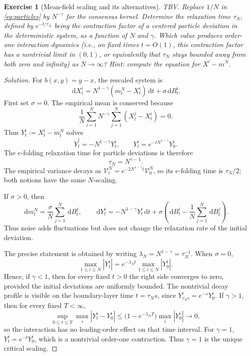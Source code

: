 \documentclass[11pt]{amsart}
\numberwithin{equation}{section}
\theoremstyle{plain}
\newtheorem{exercise}[theorem]{Exercise}
\newcommand{\dd}{\,\mathrm{d}}
\newcommand{\abs}[1]{\left\lvert#1\right\rvert}
\begin{document}
\begin{exercise}[Mean-field scaling and its alternatives] TBV. 
Replace $1/N$ in \eqref{eq:particles} by $N^{-\gamma}$ for the consensus
kernel.  Determine the relaxation time $\tau_N$, defined by
$e^{-t/\tau_N}$ being the contraction factor of a centered particle
deviation in the deterministic system, as a function of $N$ and $\gamma$.
Which value produces order-one interaction dynamics (i.e., on
fixed times $t=O(1)$, this contraction factor has a nontrivial limit in
$(0,1)$, or equivalently that $\tau_N$ stays bounded away from both zero and
infinity) as $N\to\infty$?
\emph{Hint:} compute the equation for $X^i-m^N$.
\end{exercise}
\begin{proof}[Solution]
For $b(x,y)=y-x$, the rescaled system is
\begin{equation}\label{eq:scaled-consensus}
 \dd X_t^i=N^{1-\gamma}(m_t^N-X_t^i)\dd t+\sigma\dd B_t^i.
\end{equation}
First set $\sigma=0$.  The empirical mean is conserved because
\[
 \frac1N\sum_{i=1}^N N^{-\gamma}
       \sum_{j=1}^N(X_t^j-X_t^i)=0.
\]
Thus $Y_t^i:=X_t^i-m_t^N$ solves
\[
 \dot Y_t^i=-N^{1-\gamma}Y_t^i,
 \qquad
 Y_t^i=e^{-t N^{1-\gamma}}Y_0^i.
\]
The $e$-folding relaxation time for particle deviations is therefore
\begin{equation}\label{eq:relaxation-time}
 \tau_N=N^{\gamma-1}.
\end{equation}
The empirical variance decays as
$\mathcal V_t^N=e^{-2N^{1-\gamma}t}\mathcal V_0^N$, so its $e$-folding time is
$\tau_N/2$; both notions have the same $N$-scaling.

If $\sigma>0$, then
\[
 \dd m_t^N=\frac{\sigma}{N}\sum_{j=1}^N\dd B_t^j,
 \qquad
 \dd Y_t^i=-N^{1-\gamma}Y_t^i\dd t
 +\sigma\left(\dd B_t^i-\frac1N\sum_{j=1}^N\dd B_t^j\right).
\]
Thus noise adds fluctuations but does not change the relaxation rate of the
initial deviation. 

The precise statement is obtained by writing
$\lambda_N=N^{1-\gamma}=\tau_N^{-1}$.  When $\sigma=0$,
\[
 \max_{1\leq i\leq N}\abs{Y_t^i}
 =e^{-\lambda_Nt}\max_{1\leq i\leq N}\abs{Y_0^i}.
\]
Hence, if $\gamma<1$, then for every fixed $t>0$ the right side converges to
zero, provided the initial deviations are uniformly bounded.  The nontrivial
decay profile is visible on the boundary-layer time $t=\tau_Ns$, since
$Y_{\tau_Ns}^i=e^{-s}Y_0^i$.  If $\gamma>1$, then for every fixed $T<\infty$,
\[
 \sup_{0\leq t\leq T}\max_i\abs{Y_t^i-Y_0^i}
 \leq\bigl(1-e^{-\lambda_NT}\bigr)\max_i\abs{Y_0^i}
 \longrightarrow0,
\]
so the interaction has no leading-order effect on that time interval.  For
$\gamma=1$, $Y_t^i=e^{-t}Y_0^i$, which is a nontrivial order-one contraction.
Thus $\boxed{\gamma=1}$ is the unique critical scaling.


\end{proof}
\end{document}
